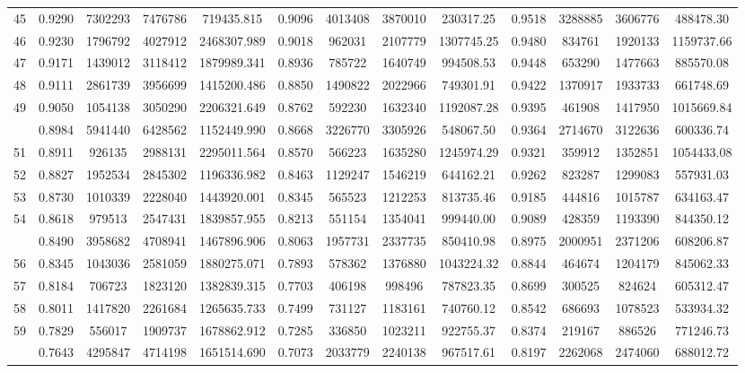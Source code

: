 \documentclass[
  12pt,
]{article}
\begin{document}
\begin{longtable}[t]{lcccccccccccc}
45 & 0.9290 & 7302293 & 7476786 & 719435.815 & 0.9096 & 4013408 & 3870010 & 230317.25 & 0.9518 & 3288885 & 3606776 & 488478.30\\
46 & 0.9230 & 1796792 & 4027912 & 2468307.989 & 0.9018 & 962031 & 2107779 & 1307745.25 & 0.9480 & 834761 & 1920133 & 1159737.66\\
47 & 0.9171 & 1439012 & 3118412 & 1879989.341 & 0.8936 & 785722 & 1640749 & 994508.53 & 0.9448 & 653290 & 1477663 & 885570.08\\
48 & 0.9111 & 2861739 & 3956699 & 1415200.486 & 0.8850 & 1490822 & 2022966 & 749301.91 & 0.9422 & 1370917 & 1933733 & 661748.69\\
49 & 0.9050 & 1054138 & 3050290 & 2206321.649 & 0.8762 & 592230 & 1632340 & 1192087.28 & 0.9395 & 461908 & 1417950 & 1015669.84\\
\addlinespace
50 & 0.8984 & 5941440 & 6428562 & 1152449.990 & 0.8668 & 3226770 & 3305926 & 548067.50 & 0.9364 & 2714670 & 3122636 & 600336.74\\
51 & 0.8911 & 926135 & 2988131 & 2295011.564 & 0.8570 & 566223 & 1635280 & 1245974.29 & 0.9321 & 359912 & 1352851 & 1054433.08\\
52 & 0.8827 & 1952534 & 2845302 & 1196336.982 & 0.8463 & 1129247 & 1546219 & 644162.21 & 0.9262 & 823287 & 1299083 & 557931.03\\
53 & 0.8730 & 1010339 & 2228040 & 1443920.001 & 0.8345 & 565523 & 1212253 & 813735.46 & 0.9185 & 444816 & 1015787 & 634163.47\\
54 & 0.8618 & 979513 & 2547431 & 1839857.955 & 0.8213 & 551154 & 1354041 & 999440.00 & 0.9089 & 428359 & 1193390 & 844350.12\\
\addlinespace
55 & 0.8490 & 3958682 & 4708941 & 1467896.906 & 0.8063 & 1957731 & 2337735 & 850410.98 & 0.8975 & 2000951 & 2371206 & 608206.87\\
56 & 0.8345 & 1043036 & 2581059 & 1880275.071 & 0.7893 & 578362 & 1376880 & 1043224.32 & 0.8844 & 464674 & 1204179 & 845062.33\\
57 & 0.8184 & 706723 & 1823120 & 1382839.315 & 0.7703 & 406198 & 998496 & 787823.35 & 0.8699 & 300525 & 824624 & 605312.47\\
58 & 0.8011 & 1417820 & 2261684 & 1265635.733 & 0.7499 & 731127 & 1183161 & 740760.12 & 0.8542 & 686693 & 1078523 & 533934.32\\
59 & 0.7829 & 556017 & 1909737 & 1678862.912 & 0.7285 & 336850 & 1023211 & 922755.37 & 0.8374 & 219167 & 886526 & 771246.73\\
\addlinespace
60 & 0.7643 & 4295847 & 4714198 & 1651514.690 & 0.7073 & 2033779 & 2240138 & 967517.61 & 0.8197 & 2262068 & 2474060 & 688012.72\\

\end{longtable}
\end{document}
